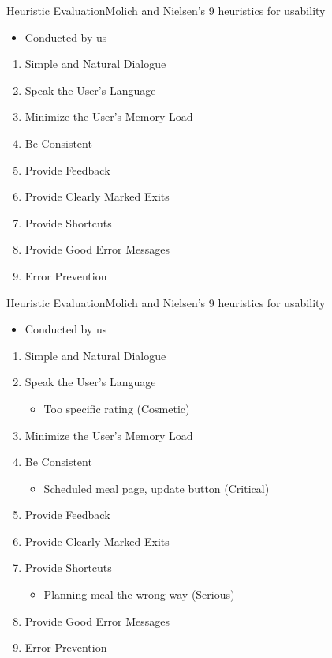 \begin{frame}{Heuristic Evaluation}{Molich and Nielsen’s 9 heuristics for usability}
    \begin{itemize}
        \item Conducted by us
    \end{itemize}
    \begin{enumerate}
        \item Simple and Natural Dialogue
        \item Speak the User’s Language
        \item Minimize the User’s Memory Load 
        \item Be Consistent
        \item Provide Feedback 
        \item Provide Clearly Marked Exits 
        \item Provide Shortcuts 
        \item Provide Good Error Messages
        \item Error Prevention
    \end{enumerate}
\end{frame}

\begin{frame}{Heuristic Evaluation}{Molich and Nielsen’s 9 heuristics for usability}
    \begin{itemize}
        \item Conducted by us
    \end{itemize}
    \begin{enumerate}
        \item Simple and Natural Dialogue
        \item Speak the User’s Language
        \begin{itemize}
            \item Too specific rating (Cosmetic)
        \end{itemize}
        \item Minimize the User’s Memory Load 
        \item Be Consistent
        \begin{itemize}
            \item Scheduled meal page, update button (Critical)
        \end{itemize}
        \item Provide Feedback 
        \item Provide Clearly Marked Exits 
        \item Provide Shortcuts 
        \begin{itemize}
            \item Planning meal the wrong way (Serious)
        \end{itemize}
        \item Provide Good Error Messages
        \item Error Prevention
    \end{enumerate}
\end{frame}

